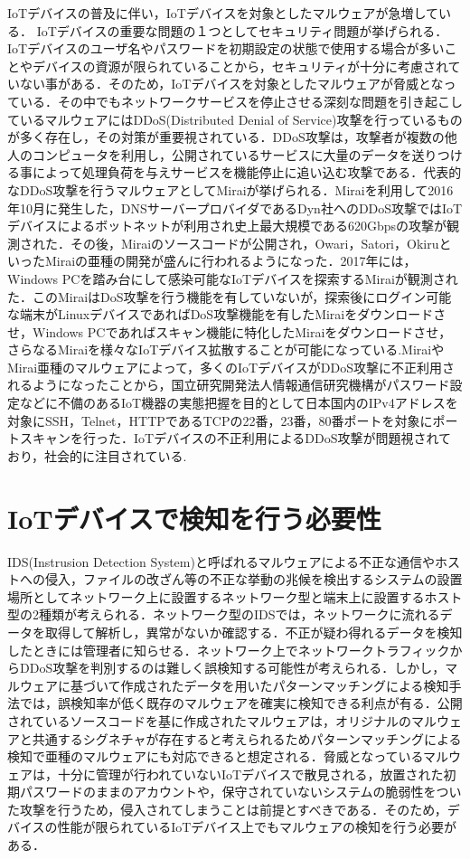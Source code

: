 IoTデバイスの普及に伴い，IoTデバイスを対象としたマルウェアが急増している．
IoTデバイスの重要な問題の１つとしてセキュリティ問題が挙げられる．IoTデバイスのユーザ名やパスワードを初期設定の状態で使用する場合が多いことやデバイスの資源が限られていることから，セキュリティが十分に考慮されていない事がある．そのため，IoTデバイスを対象としたマルウェアが脅威となっている．その中でもネットワークサービスを停止させる深刻な問題を引き起こしているマルウェアにはDDoS(Distributed Denial of Service)攻撃を行っているものが多く存在し，その対策が重要視されている．DDoS攻撃は，攻撃者が複数の他人のコンピュータを利用し，公開されているサービスに大量のデータを送りつける事によって処理負荷を与えサービスを機能停止に追い込む攻撃である．代表的なDDoS攻撃を行うマルウェアとしてMiraiが挙げられる．Miraiを利用して2016年10月に発生した，DNSサーバープロバイダであるDyn社へのDDoS攻撃ではIoTデバイスによるボットネットが利用され史上最大規模である620Gbpsの攻撃が観測された\cite{Dyn}．その後，Miraiのソースコードが公開され，Owari，Satori，OkiruといったMiraiの亜種の開発が盛んに行われるようになった．2017年には，Windows PCを踏み台にして感染可能なIoTデバイスを探索するMiraiが観測された\cite{newMirai}．このMiraiはDoS攻撃を行う機能を有していないが，探索後にログイン可能な端末がLinuxデバイスであればDoS攻撃機能を有したMiraiをダウンロードさせ，Windows PCであればスキャン機能に特化したMiraiをダウンロードさせ，さらなるMiraiを様々なIoTデバイス拡散することが可能になっている.MiraiやMirai亜種のマルウェアによって，多くのIoTデバイスがDDoS攻撃に不正利用されるようになったことから，国立研究開発法人情報通信研究機構がパスワード設定などに不備のあるIoT機器の実態把握を目的として日本国内のIPv4アドレスを対象にSSH，Telnet，HTTPであるTCPの22番，23番，80番ポートを対象にポートスキャンを行った\cite{国立}．IoTデバイスの不正利用によるDDoS攻撃が問題視されており，社会的に注目されている.

\section{IoTデバイスで検知を行う必要性}

IDS(Instrusion Detection System)と呼ばれるマルウェアによる不正な通信やホストへの侵入，ファイルの改ざん等の不正な挙動の兆候を検出するシステムの設置場所としてネットワーク上に設置するネットワーク型と端末上に設置するホスト型の2種類が考えられる．ネットワーク型のIDSでは，ネットワークに流れるデータを取得して解析し，異常がないか確認する．不正が疑わ得れるデータを検知したときには管理者に知らせる．ネットワーク上でネットワークトラフィックからDDoS攻撃を判別するのは難しく誤検知する可能性が考えられる．しかし，マルウェアに基づいて作成されたデータを用いたパターンマッチングによる検知手法では，誤検知率が低く既存のマルウェアを確実に検知できる利点が有る．公開されているソースコードを基に作成されたマルウェアは，オリジナルのマルウェアと共通するシグネチャが存在すると考えられるためパターンマッチングによる検知で亜種のマルウェアにも対応できると想定される．脅威となっているマルウェアは，十分に管理が行われていないIoTデバイスで散見される，放置された初期パスワードのままのアカウントや，保守されていないシステムの脆弱性をついた攻撃を行うため，侵入されてしまうことは前提とすべきである．そのため，デバイスの性能が限られているIoTデバイス上でもマルウェアの検知を行う必要がある．

